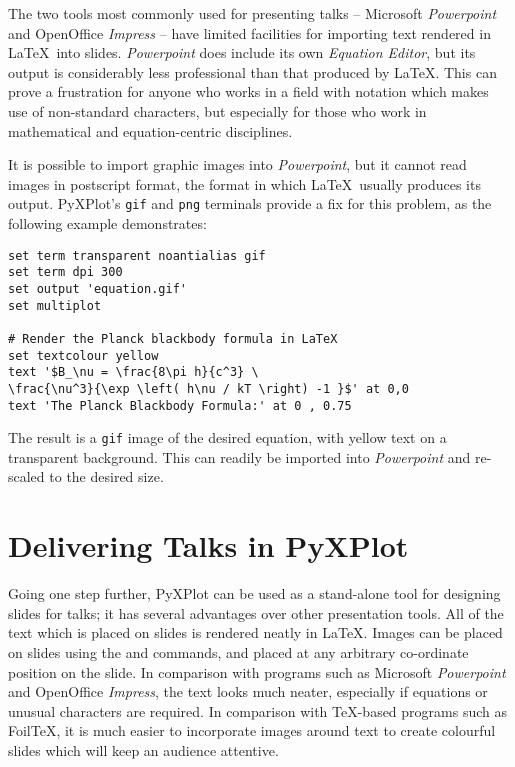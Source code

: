 The two tools most commonly used for presenting talks --
Microsoft {\it Powerpoint} and
OpenOffice {\it Impress} -- have limited facilities for importing
text rendered in \LaTeX\ into slides. {\it Powerpoint} does
include its own {\it Equation Editor}, but its output is considerably less
professional than that produced by \LaTeX.  This can prove a frustration for
anyone who works in a field with notation which makes use of non-standard
characters, but especially for those who work in mathematical and
equation-centric disciplines.

It is possible to import graphic images into {\it Powerpoint}, but it cannot
read images in postscript format, the format in which \LaTeX\ usually produces
its output.  PyXPlot's {\tt gif} and {\tt png} terminals provide a fix for this
problem, as the following example demonstrates:

\begin{verbatim}
set term transparent noantialias gif
set term dpi 300
set output 'equation.gif'
set multiplot

# Render the Planck blackbody formula in LaTeX
set textcolour yellow
text '$B_\nu = \frac{8\pi h}{c^3} \
\frac{\nu^3}{\exp \left( h\nu / kT \right) -1 }$' at 0,0
text 'The Planck Blackbody Formula:' at 0 , 0.75
\end{verbatim}

The result is a {\tt gif} image of the desired equation, with yellow text on a
transparent background. This can readily be imported into {\it Powerpoint} and
re-scaled to the desired size.

\section{Delivering Talks in PyXPlot}

Going one step further, PyXPlot can be used as a stand-alone tool for designing
slides for talks; it has several advantages over other presentation tools.  All
of the text which is placed on slides is rendered neatly in \LaTeX.  Images can
be placed on slides using the \indcmdts{jpeg} and \indcmdts{eps} commands, and
placed at any arbitrary co-ordinate position on the slide.  In comparison with
programs such as Microsoft {\it Powerpoint}\index{Microsoft Powerpoint} and
OpenOffice\index{OpenOffice} {\it Impress}, the text looks much neater,
especially if equations or unusual characters are required. In comparison with
\TeX-based programs such as Foil\TeX, it is much easier to incorporate images
around text to create colourful slides which will keep an audience attentive.

